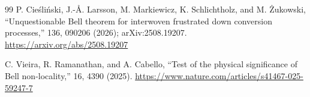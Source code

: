 \documentclass[11pt]{article}
\begin{document}
\begin{thebibliography}{99}
P. Cie\'sli\'nski, J.-\AA. Larsson, M. Markiewicz, K. Schlichtholz, and M. \.Zukowski,
\newblock ``Unquestionable Bell theorem for interwoven frustrated down conversion processes,''
 136, 090206 (2026); arXiv:2508.19207.
\newblock \url{https://arxiv.org/abs/2508.19207}

C. Vieira, R. Ramanathan, and A. Cabello,
\newblock ``Test of the physical significance of Bell non-locality,''
 16, 4390 (2025).
\newblock \url{https://www.nature.com/articles/s41467-025-59247-7}

\end{thebibliography}
\end{document}
